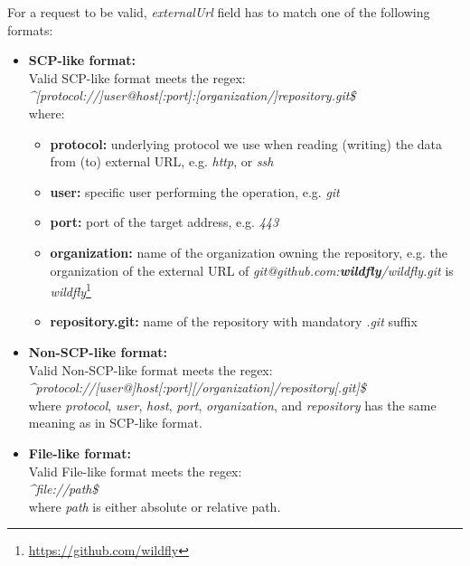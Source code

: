 \documentclass[../main.tex]{subfiles}
\begin{document}
For a request to be valid, \textit{externalUrl} field has to match one of the following formats:

\begin{itemize}
    \item \textbf{SCP-like format:}\\
    Valid SCP-like format meets the regex:\\
    \textit{\textasciicircum [protocol://]user@host[:port]:[organization/]repository.git\$}\\
    where:
    \begin{itemize}
        \item \textbf{protocol:} underlying protocol we use when reading (writing) the data from (to) external URL, e.g. \textit{http}, or \textit{ssh}

        \item \textbf{user:} specific user performing the operation, e.g. \textit{git}

        \item \textbf{port:} port of the target address, e.g. \textit{443}

        \item \textbf{organization:} name of the organization owning the repository, e.g. the organization of the external URL of \textit{git@github.com:\textbf{wildfly}/wildfly.git} is \textit{wildfly}\footnote{\url{https://github.com/wildfly}}

        \item \textbf{repository.git:} name of the repository with mandatory \textit{.git} suffix
    \end{itemize}

    \item \textbf{Non-SCP-like format:}\\
    Valid Non-SCP-like format meets the regex:\\
    \textit{\textasciicircum protocol://[user@]host[:port][/organization]/repository[.git]\$}\\
    where \textit{protocol}, \textit{user}, \textit{host}, \textit{port}, \textit{organization}, and \textit{repository} has the same meaning as in SCP-like format.

    \item \textbf{File-like format:}\\
    Valid File-like format meets the regex:\\ \textit{\textasciicircum file://path\$}\\
    where \textit{path} is either absolute or relative path.
\end{itemize}
\end{document}
